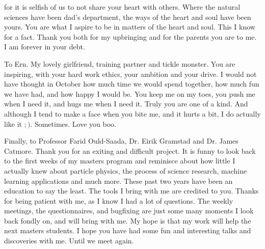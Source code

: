 for it is selfish of us to not share your heart with others. Where the natural sciences have been dad's department, the ways 
of the heart and soul have been yours. You are what I aspire to be in matters of the heart and soul. This I know for a fact. 
Thank you both for my upbringing and for the parents you are to me. I am forever in your debt. \par 
To Ern. My lovely girlfriend, training partner and tickle monster. You are inspiring, with your hard work ethics, your ambition 
and your drive. I would not have thought in October how much time we would spend together, how much fun we have had, and how happy 
I would be. You keep me on my toes, you push me when I need it, and hugs me when I need it. Truly you are one of a kind. 
And although I tend to make a face when you bite me, and it hurts a bit, I do actually like it $;)$. Sometimes. Love you boo.\par
Finally, to Professor Farid Ould-Saada, Dr. Eirik Gramstad and Dr. James Catmore. Thank you for an exiting and difficult project. 
It is funny to look back to the first weeks of my masters program and reminisce about how little I actually knew about particle physics, 
the process of science research, machine learning applications and much more. These past two years have been an education 
to say the least. The tools I bring with me are credited to you. Thanks for being patient with me, as I know I had a lot of questions. 
The weekly meetings, the questionnaires, and bugfixing are just some many moments I look back fondly on, and will bring with me. 
My hope is that my work will help the next masters students. I hope you have had some fun and interesting talks 
and discoveries with me. Until we meet again. 
